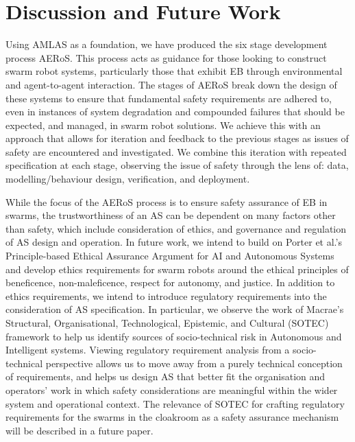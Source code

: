 \documentclass[runningheads]{llncs}
\begin{document}
\section{Discussion and Future Work} \label{discussion-conclusions}
Using AMLAS \cite{Hawkins2021} as a foundation, we have produced the six stage development process AERoS. This process acts as guidance for those looking to construct swarm robot systems, particularly those that exhibit EB through environmental and agent-to-agent interaction. The stages of AERoS break down the design of these systems to ensure that fundamental safety requirements are adhered to, even in instances of system degradation and compounded failures that should be expected, and managed, in swarm robot solutions. We achieve this with an approach that allows for iteration and feedback to the previous stages as issues of safety are encountered and investigated. We combine this iteration with repeated specification at each stage, observing the issue of safety through the lens of: data, modelling/behaviour design, verification, and deployment.

While the focus of the AERoS process is to ensure safety assurance of EB in swarms, the trustworthiness of an AS can be dependent on many factors other than safety, which include consideration of ethics, and governance and regulation of AS design and operation. 
In future work, we intend to build on Porter et al.’s \cite{Porter2022} Principle-based Ethical Assurance Argument for AI and Autonomous Systems and develop ethics requirements for swarm robots around the ethical principles of beneficence, non-maleficence, respect for autonomy, and justice. 
In addition to ethics requirements, we intend to introduce regulatory requirements into the consideration of AS specification. In particular, we observe the work of Macrae’s~\cite{macrae2021learning} Structural, Organisational, Technological, Epistemic, and Cultural (SOTEC) framework to help us identify sources of socio-technical risk in Autonomous and Intelligent systems. Viewing regulatory requirement analysis from a socio-technical perspective allows us to move away from a purely technical conception of requirements, and helps us design AS that better fit the organisation and operators’ work in which safety considerations are meaningful within the wider system and operational context. The relevance of SOTEC for crafting regulatory requirements for the swarms in the cloakroom as a safety assurance mechanism will be described in a future paper. 
\end{document}
